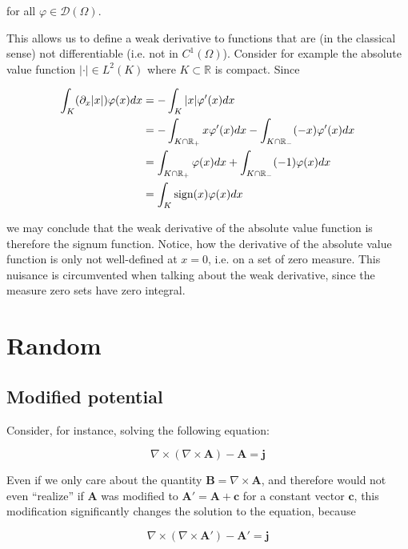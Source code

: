 \documentclass[11pt, a4paper]{article}
\begin{document}
for all $\varphi \in \mathcal{D}(\Omega)$.

This allows us to define a weak derivative to functions that are (in the classical
sense) not differentiable (i.e. not in $C^1(\Omega)$). Consider for example the 
absolute value function $|\cdot| \in L^2(K)$ where $K \subset \mathbb{R}$ is compact.
Since

\begin{align}
    \int_K (\partial_x |x|) \varphi(x) dx &= -\int_K |x| \varphi'(x) dx \notag \\ 
    &= - \int_{K \cap \mathbb{R}_+} x \varphi'(x) dx - \int_{K \cap \mathbb{R}_-} (-x) \varphi'(x) dx \notag \\ 
    &= \int_{K \cap \mathbb{R}_+} \varphi(x) dx + \int_{K \cap \mathbb{R}_-} (-1) \varphi(x) dx \notag \\
    &= \int_K \text{sign}(x) \varphi(x) dx
\end{align}

we may conclude that the weak derivative of the absolute value function is therefore
the signum function. Notice, how the derivative of the absolute value function
is only not well-defined at $x=0$, i.e. on a set of zero measure. This nuisance
is circumvented when talking about the weak derivative, since the measure zero
sets have zero integral.

\section{Random}
\label{sec:random}

\subsection{Modified potential}
\label{subsec:modpot}

Consider, for instance, solving the following equation:

\begin{equation}
    \nabla \times (\nabla \times \mathbf{A}) - \mathbf{A} = \mathbf{j}
\end{equation}

Even if we only care about the quantity $\mathbf{B} = \nabla \times \mathbf{A}$,
and therefore would not even \enquote{realize} if $\mathbf{A}$ was modified to
$\mathbf{A}' = \mathbf{A} + \mathbf{c}$ for a constant vector $\mathbf{c}$, this
modification significantly changes the solution to the equation, because 

\begin{equation}
    \nabla \times (\nabla \times \mathbf{A}') - \mathbf{A}' = \mathbf{j}
\end{equation}
\end{document}

